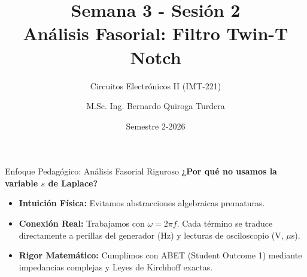 \documentclass[aspectratio=169, 10pt]{beamer}
\title[Filtro Twin-T Notch]{Semana 3 - Sesión 2\\Análisis Fasorial: Filtro Twin-T Notch}
\subtitle{Circuitos Electrónicos II (IMT-221)}
\author[M.Sc. Ing. B. Quiroga]{M.Sc. Ing. Bernardo Quiroga Turdera}
\institute[UCB Tarija]{Universidad Católica Boliviana ``San Pablo''}
\date{Semestre 2-2026}
\begin{document}
\begin{frame}
    \titlepage
\end{frame}

\begin{frame}{Enfoque Pedagógico: Análisis Fasorial Riguroso}
    \textbf{¿Por qué no usamos la variable $s$ de Laplace?}
    \vspace{0.3cm}
    \begin{itemize}
        \setlength{\itemsep}{5pt}
        \item \textbf{Intuición Física:} Evitamos abstracciones algebraicas prematuras.
        \item \textbf{Conexión Real:} Trabajamos con $\omega = 2\pi f$. Cada término se traduce directamente a perillas del generador (Hz) y lecturas de osciloscopio (V, $\mu$s).
        \item \textbf{Rigor Matemático:} Cumplimos con ABET (Student Outcome 1) mediante impedancias complejas y Leyes de Kirchhoff exactas.
    \end{itemize}
\end{frame}
\end{document}
